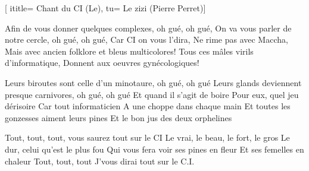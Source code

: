  [
ititle= {Chant du CI (Le)},
tu= {Le zizi (Pierre Perret)}]

\beginverse
Afin de vous donner quelques complexes, oh gué, oh gué,
On va vous parler de notre cercle, oh gué, oh gué,
Car CI on vous l'dira,
Ne rime pas avec Maccha,
Mais avec ancien folklore et bleus multicolores!
Tous ces mâles virils d'informatique,
Donnent aux oeuvres gynécologiques!
\endverse

\beginverse
Leurs biroutes sont celle d'un minotaure, oh gué, oh gué
Leurs glands deviennent presque carnivores, oh gué, oh gué
Et quand il s'agit de boire
Pour eux, quel jeu dérisoire
Car tout informaticien
A une choppe dans chaque main
Et toutes les gonzesses aiment leurs pines
Et le bon jus des deux orphelines
\endverse

\beginverse
Tout, tout, tout, vous saurez tout sur le CI
Le vrai, le beau, le fort, le gros
Le dur, celui qu'est le plus fou
Qui vous fera voir ses pines en fleur
Et ses femelles en chaleur
Tout, tout, tout
J'vous dirai tout sur le C.I.
\endverse

\endsong